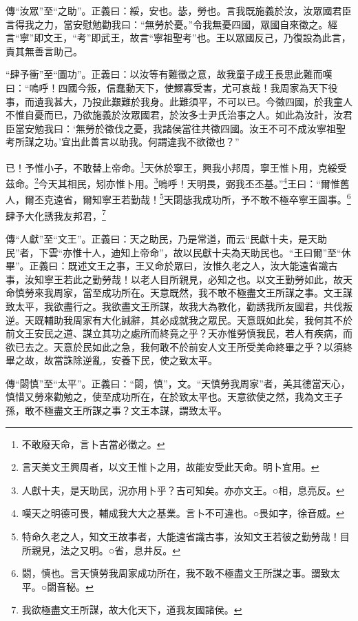 {\noindent\zhuan{}\fzbyks 傳“汝眾”至“之助”。正義曰：綏，安也。毖，勞也。言我既施義於汝，汝眾國君臣言得我之力，當安慰勉勸我曰：“無勞於憂。”令我無憂四國，眾國自來徵之。經言“寧”即文王，“考”即武王，故言“寧祖聖考”也。王以眾國反己，乃復設為此言，責其無善言助己。 \par}

{\noindent\shu{}\fzkt “肆予衝”至“圖功”。正義曰：以汝等有難徵之意，故我童子成王長思此難而嘆曰：“嗚呼！四國今叛，信蠢動天下，使鰥寡受害，尤可哀哉！我周家為天下役事，而遺我甚大，乃投此艱難於我身。此難須平，不可以已。今徵四國，於我童人不惟自憂而已，乃欲施義於汝眾國君，於汝多士尹氏治事之人。如此為汝計，汝君臣當安勉我曰：‘無勞於徵伐之憂，我諸侯當往共徵四國。汝王不可不成汝寧祖聖考所謀之功。’宜出此善言以助我。何謂違我不欲徵也？” \par}

已！予惟小子，不敢替上帝命。\footnote{不敢廢天命，言卜吉當必徵之。}天休於寧王，興我小邦周，寧王惟卜用，克綏受茲命。\footnote{言天美文王興周者，以文王惟卜之用，故能安受此天命。明卜宜用。}今天其相民，矧亦惟卜用。\footnote{人獻十夫，是天助民，況亦用卜乎？吉可知矣。亦亦文王。○相，息亮反。}嗚呼！天明畏，弼我丕丕基。”\footnote{嘆天之明德可畏，輔成我大大之基業。言卜不可違也。○畏如字，徐音威。}王曰：“爾惟舊人，爾丕克遠省，爾知寧王若勤哉！\footnote{特命久老之人，知文王故事者，大能遠省識古事，汝知文王若彼之勤勞哉！目所親見，法之又明。○省，息井反。}天閟毖我成功所，予不敢不極卒寧王圖事。\footnote{閟，慎也。言天慎勞我周家成功所在，我不敢不極盡文王所謀之事。謂致太平。○閟音秘。}肆予大化誘我友邦君，\footnote{我欲極盡文王所謀，故大化天下，道我友國諸侯。}



{\noindent\zhuan{}\fzbyks 傳“人獻”至“文王”。正義曰：天之助民，乃是常道，而云“民獻十夫，是天助民”者，下雲“亦惟十人，迪知上帝命”，故以民獻十夫為天助民也。“王曰爾”至“休畢”。正義曰：既述文王之事，王又命於眾曰，汝惟久老之人，汝大能遠省識古事，汝知寧王若此之勤勞哉！以老人目所親見，必知之也。以文王勤勞如此，故天命慎勞來我周家，當至成功所在。天意既然，我不敢不極盡文王所謀之事。文王謀致太平，我欲盡行之。我欲盡文王所謀，故我大為教化，勸誘我所友國君，共伐叛逆。天既輔助我周家有大化誠辭，其必成就我之眾民。天意既如此矣，我何其不於前文王安民之道、謀立其功之處所而終竟之乎？天亦惟勞慎我民，若人有疾病，而欲已去之。天意於民如此之急，我何敢不於前安人文王所受美命終畢之乎？以須終畢之故，故當誅除逆亂，安養下民，使之致太平。 \par}

{\noindent\zhuan{}\fzbyks 傳“閟慎”至“太平”。正義曰：“閟，慎”，文。“天慎勞我周家”者，美其德當天心，慎惜又勞來勸勉之，使至成功所在，在於致太平也。天意欲使之然，我為文王子孫，敢不極盡文王所謀之事？文王本謀，謂致太平。 \par}

